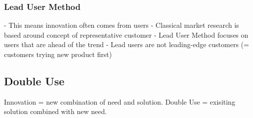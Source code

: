 \documentclass{scrartcl}
\begin{document}
\subsubsection*{Lead User Method}
- This means innovation often comes from users
- Classical market research is based around concept of representative customer
- Lead User Method focuses on users that are ahead of the trend
- Lead users are not leading-edge customers (= customers trying new product first)
\subsection*{Double Use}
Innovation = new combination of need and solution.
Double Use = exisiting solution combined with new need.
\end{document}
